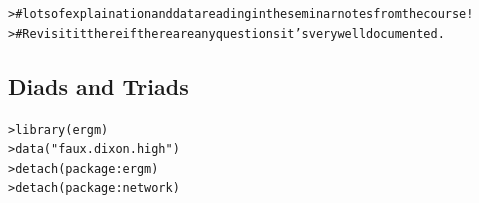 \documentclass[12pt]{article}\usepackage[]{graphicx}\usepackage[]{color}
\makeatletter
\newcommand{\hlstr}[1]{\textcolor[rgb]{0.82,0.78,0.62}{#1}}%
\newcommand{\hlcom}[1]{\textcolor[rgb]{0.404,0.408,0.42}{#1}}%
\newcommand{\hlopt}[1]{\textcolor[rgb]{0.882,0.878,0.898}{#1}}%
\newcommand{\hlstd}[1]{\textcolor[rgb]{0.882,0.878,0.898}{#1}}%
\newcommand{\hlkwd}[1]{\textcolor[rgb]{0.733,0.388,0.812}{#1}}%
\newenvironment{kframe}{%
 \def\at@end@of@kframe{}%
 \ifinner\ifhmode%
  \def\at@end@of@kframe{\end{minipage}}%
  \begin{minipage}{\columnwidth}%
 \fi\fi%
 \def\FrameCommand##1{\hskip\@totalleftmargin \hskip-\fboxsep
 \colorbox{shadecolor}{##1}\hskip-\fboxsep
     \hskip-\linewidth \hskip-\@totalleftmargin \hskip\columnwidth}%
 \MakeFramed {\advance\hsize-\width
   \@totalleftmargin\z@ \linewidth\hsize
   \@setminipage}}%
 {\par\unskip\endMakeFramed%
 \at@end@of@kframe}
\newenvironment{knitrout}{}{} %
\makeatother
\begin{document}
\begin{flushleft}
\begin{center}
\begin{knitrout}
\begin{kframe}\begin{alltt}
\hlstd{> }\hlcom{# lots of explaination and data reading in the seminar notes from the course!}
\hlstd{> }\hlcom{#   Revisit it there if there are any questions it's very well documented.}
\end{alltt}
\end{kframe}
\end{knitrout}
\end{center}

\subsection{Diads and Triads}

\begin{knitrout}
\color{fgcolor}\begin{kframe}
\begin{alltt}
\hlstd{> }\hlkwd{library}\hlstd{(ergm)}
\hlstd{> }\hlkwd{data}\hlstd{(}\hlstr{"faux.dixon.high"}\hlstd{)}
\hlstd{> }\hlkwd{detach}\hlstd{(package}\hlopt{:}\hlstd{ergm)}
\hlstd{> }\hlkwd{detach}\hlstd{(package}\hlopt{:}\hlstd{network)}
\end{alltt}



\end{kframe}
\end{knitrout}
\end{flushleft}
\end{document}
